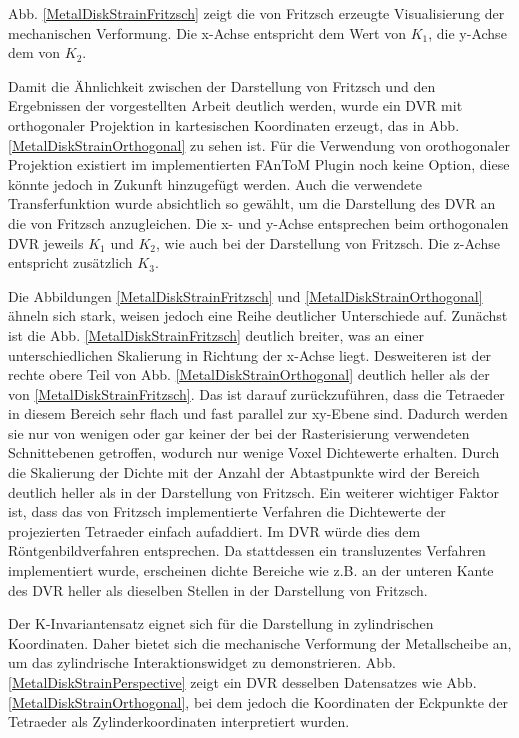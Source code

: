 \documentclass[a4paper,fontsize=12pt,toc=bib,halfparskip]{scrartcl}
\begin{document}
Abb. \ref{MetalDiskStrainFritzsch} zeigt die von Fritzsch erzeugte Visualisierung der mechanischen Verformung. Die x-Achse entspricht dem Wert von $K_1$, die y-Achse dem von $K_2$. 

Damit die \"Ahnlichkeit zwischen der Darstellung von Fritzsch und den Ergebnissen der vorgestellten Arbeit deutlich werden, wurde ein DVR mit orthogonaler Projektion in kartesischen Koordinaten erzeugt, das in Abb. \ref{MetalDiskStrainOrthogonal} zu sehen ist. F\"ur die Verwendung von orothogonaler Projektion existiert im implementierten FAnToM Plugin noch keine Option, diese k\"onnte jedoch in Zukunft hinzugef\"ugt werden. Auch die verwendete Transferfunktion wurde absichtlich so gew\"ahlt, um die Darstellung des DVR an die von Fritzsch anzugleichen. Die x- und y-Achse entsprechen beim orthogonalen DVR jeweils $K_1$ und $K_2$, wie auch bei der Darstellung von Fritzsch. Die z-Achse entspricht zus\"atzlich $K_3$.

Die Abbildungen \ref{MetalDiskStrainFritzsch} und \ref{MetalDiskStrainOrthogonal} \"ahneln sich stark, weisen jedoch eine Reihe deutlicher Unterschiede auf. Zun\"achst ist die Abb. \ref{MetalDiskStrainFritzsch} deutlich breiter, was an einer unterschiedlichen Skalierung in Richtung der x-Achse liegt. Desweiteren ist der rechte obere Teil von Abb. \ref{MetalDiskStrainOrthogonal} deutlich heller als der von \ref{MetalDiskStrainFritzsch}. Das ist darauf zur\"uckzuf\"uhren, dass die Tetraeder in diesem Bereich sehr flach und fast parallel zur xy-Ebene sind. Dadurch werden sie nur von wenigen oder gar keiner der bei der Rasterisierung verwendeten Schnittebenen getroffen, wodurch nur wenige Voxel Dichtewerte erhalten. Durch die Skalierung der Dichte mit der Anzahl der Abtastpunkte wird der Bereich deutlich heller als in der Darstellung von Fritzsch. Ein weiterer wichtiger Faktor ist, dass das von Fritzsch implementierte Verfahren die Dichtewerte der projezierten Tetraeder einfach aufaddiert. Im DVR w\"urde dies dem R\"ontgenbildverfahren entsprechen. Da stattdessen ein transluzentes Verfahren implementiert wurde, erscheinen dichte Bereiche wie z.B. an der unteren Kante des DVR heller als dieselben Stellen in der Darstellung von Fritzsch. 

Der K-Invariantensatz eignet sich f\"ur die Darstellung in zylindrischen Koordinaten. Daher bietet sich die mechanische Verformung der Metallscheibe an, um das zylindrische Interaktionswidget zu demonstrieren. Abb. \ref{MetalDiskStrainPerspective} zeigt ein DVR desselben Datensatzes wie Abb. \ref{MetalDiskStrainOrthogonal}, bei dem jedoch die Koordinaten der Eckpunkte der Tetraeder als Zylinderkoordinaten interpretiert wurden.
\end{document}
